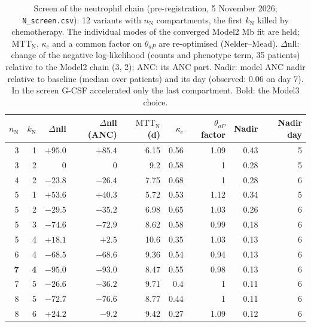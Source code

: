 \begin{table}[!htbp]
\centering
\small
\setlength{\tabcolsep}{3.5pt}
\caption{Screen of the neutrophil chain (pre-registration, 5 November 2026; \texttt{N\_screen.csv}): 12 variants with $n_{\mathrm{N}}$ compartments, the first $k_{\mathrm{N}}$ killed by chemotherapy. The individual modes of the converged Model2 Mb fit are held; $\mathrm{MTT}_{\mathrm{N}}$, $\kappa_c$ and a common factor on $\theta_{aP}$ are re-optimised (Nelder--Mead). $\Delta$nll: change of the negative log-likelihood (counts and phenotype term, 35 patients) relative to the Model2 chain (3, 2); ANC: its ANC part. Nadir: model ANC nadir relative to baseline (median over patients) and its day (observed: 0.06 on day 7). In the screen G-CSF accelerated only the last compartment. Bold: the Model3 choice.}
\label{tab:nscreen}
\begin{tabular}{rrrrrrrrr}
\toprule
$n_{\mathrm{N}}$ & $k_{\mathrm{N}}$ & $\Delta$nll & $\Delta$nll (ANC) & $\mathrm{MTT}_{\mathrm{N}}$ (d) & $\kappa_c$ & $\theta_{aP}$ factor & Nadir & Nadir day \\
\midrule
3 & 1 & $+95.0$ & $+85.4$ & 6.15 & 0.56 & 1.09 & 0.43 & 5 \\
3 & 2 & 0 & 0 & 9.2 & 0.58 & 1 & 0.28 & 5 \\
4 & 2 & $-23.8$ & $-26.4$ & 7.75 & 0.68 & 1 & 0.28 & 6 \\
5 & 1 & $+53.6$ & $+40.3$ & 5.72 & 0.53 & 1.12 & 0.34 & 5 \\
5 & 2 & $-29.5$ & $-35.2$ & 6.98 & 0.65 & 1.03 & 0.26 & 6 \\
5 & 3 & $-74.6$ & $-72.9$ & 8.62 & 0.58 & 0.99 & 0.18 & 6 \\
5 & 4 & $+18.1$ & $+2.5$ & 10.6 & 0.35 & 1.03 & 0.13 & 6 \\
6 & 4 & $-68.5$ & $-68.6$ & 9.36 & 0.54 & 0.94 & 0.13 & 6 \\
\textbf{7} & \textbf{4} & $-95.0$ & $-93.0$ & 8.47 & 0.55 & 0.98 & 0.13 & 6 \\
7 & 5 & $-26.6$ & $-36.2$ & 9.71 & 0.4 & 1 & 0.11 & 6 \\
8 & 5 & $-72.7$ & $-76.6$ & 8.77 & 0.44 & 1 & 0.11 & 6 \\
8 & 6 & $+24.2$ & $-9.2$ & 9.42 & 0.27 & 1.09 & 0.12 & 6 \\
\bottomrule
\end{tabular}
\end{table}
